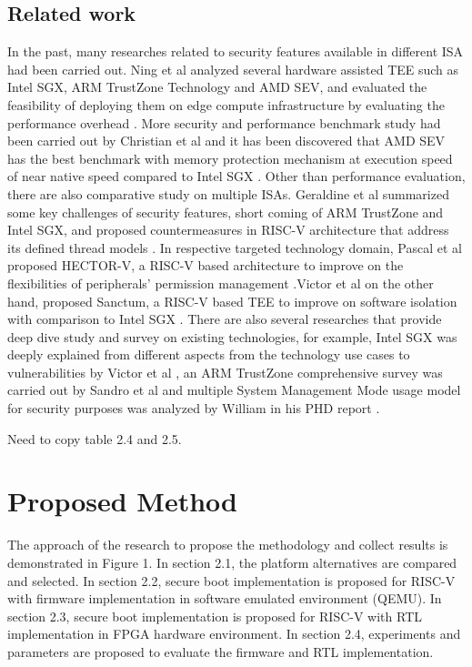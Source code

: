 \documentclass[a4paper,fleqn]{cas-dc}
\begin{document}
\subsection{ Related work}
In the past, many researches related to security features available in different ISA had been carried out.
Ning et al analyzed several hardware assisted TEE such as Intel SGX, ARM TrustZone Technology
and AMD SEV, and evaluated the feasibility of deploying them on edge compute infrastructure by evaluating the performance overhead \cite{R5:2}.
More security and performance benchmark study had been carried out by Christian et al and it has been discovered that AMD SEV has the best benchmark with memory protection mechanism at execution speed of near native speed compared to Intel SGX \cite{R5:3}.
Other than performance evaluation, there are also comparative study on multiple ISAs. Geraldine et
al summarized some key challenges of security features, short coming of ARM TrustZone and Intel SGX, and proposed countermeasures in RISC-V architecture that address its defined thread models \cite{R5:4}.
In respective targeted technology domain, Pascal et al proposed HECTOR-V, a RISC-V based architecture to improve on the flexibilities of peripherals’ permission management \cite{R5:5}.Victor et al on the other hand, proposed Sanctum, a RISC-V based TEE to improve on software isolation with comparison to Intel SGX  \cite{R5:6}. There are also several researches that provide deep dive study and survey on existing technologies, for example, Intel SGX was deeply explained from different aspects from the technology use cases to vulnerabilities by Victor et al \cite{R5:7}, an ARM TrustZone comprehensive survey was carried out by Sandro et al \cite{R5:8} and multiple System Management Mode usage model for security purposes was analyzed by William in his PHD report \cite{R5:9}.

Need to copy table 2.4 and 2.5.

\section{ Proposed Method}
The approach of the research to propose the methodology and collect results is demonstrated in Figure 1. In section 2.1, the platform alternatives are compared and selected. In section 2.2, secure boot implementation is proposed for RISC-V with firmware implementation in software emulated environment (QEMU). In section 2.3, secure boot implementation is proposed for RISC-V with RTL implementation in FPGA hardware environment. In section 2.4, experiments and parameters are proposed to evaluate the firmware and RTL implementation.
\end{document}
